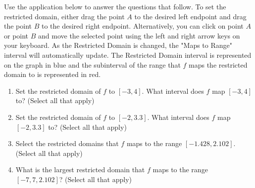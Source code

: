 \documentclass{ximera}
\author{Kevin James}
\begin{document}
   \begin{exercise}
   	  Use the application below to answer the questions that follow.  To set the restricted domain, either drag the point $ A $ to the desired left endpoint and drag the point $ B $ to the desired right endpoint.  Alternatively, you can click on point $ A $ or point $ B $ and move the selected point using the left and right arrow keys on your keyboard.  As the Restricted Domain is changed, the "Maps to Range" interval will automatically update.  The Restricted Domain interval is represented on the graph in blue and the subinterval of the range that $ f $ maps the restricted domain to is represented in red.
   	  \begin{center}
   	  	\begin{onlineOnly}
   	    \end{onlineOnly} 
     \end{center}
 	 \begin{enumerate}
 	 	\item Set the restricted domain of $ f $ to $ [-3, 4] $.  What interval does $ f $ map $ [-3, 4] $ to?  (Select all that apply)
   	       \begin{multipleChoice}
   	         \choice{$ \left[f(-3), f(4)\right] $}
   	         \choice{$ [1.576, -1.2] $}
   	         \choice[correct]{$ [-1.428, 2.102] $}
   	       \end{multipleChoice}
        \item Set the restricted domain of $ f $ to $ [-2, 3.3] $.  What interval does $ f $ map $ [-2,3.3] $ to?  (Select all that apply)
           \begin{selectAll}
           	\choice[correct]{$ \left[f(-2), f(3.3)\right] $}
           	\choice{$ [-2,2] $}
           	\choice[correct]{$ [-1.428, 2.102] $}
          \end{selectAll}
        \item Select the restricted domains that $ f $ maps to the range $ [-1.428, 2.102] $.  (Select all that apply)
          \begin{selectAll}
          	\choice[correct]{$ [-3, 5] $}
          	\choice[correct]{$ [-4, 3.5] $}
          	\choice{$ \left[f(-2).f(3.3)\right] $}
          \end{selectAll}
        \item What is the largest restricted domain that $ f $ maps to the range $ [-7,7, 2.102] $?  (Select all that apply)

\end{enumerate}
\end{exercise}
\end{document}

